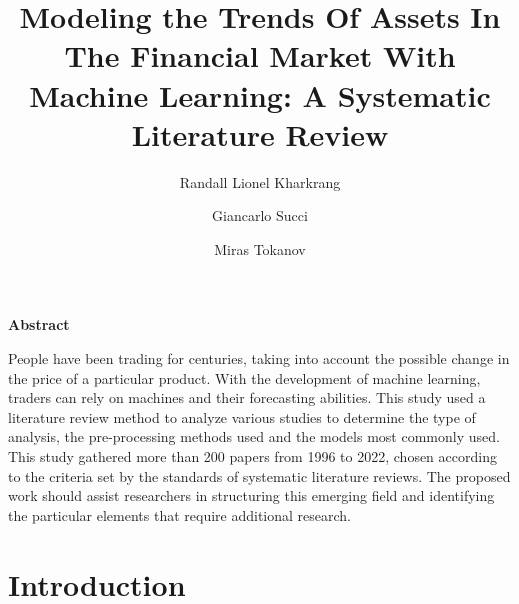 \documentclass[11pt]{article}
\begin{document}
\onehalfspacing      %

\newcommand{\tit}{Modeling the Trends Of Assets In The Financial Market With Machine Learning: A Systematic Literature Review}

\author[1]{Randall Lionel Kharkrang}
\author[2]{Giancarlo Succi}
\author[3]{Miras Tokanov}
\date{}

\newcommand{\abs}{People have been trading for centuries, taking into account the possible change in the price of a particular product. With the development of machine learning, traders can rely on machines and their forecasting abilities. This study used a literature review method to analyze various studies to determine the type of analysis, the pre-processing methods used and the models most commonly used. This study gathered more than 200 papers from 1996 to 2022,  chosen according to the criteria set by the standards of systematic literature reviews.
The proposed work should assist researchers in structuring this emerging field and identifying the particular elements that require additional research.}

\title{{\bf \tit}}

\maketitle

\newpage

\doublespacing
\renewcommand{\footnote}{\endnote}  %

\vspace*{1in}

\centerline{\bf Abstract}
\medskip
\abs

\clearpage


\section{Introduction}\label{S:introduction}
\end{document}

